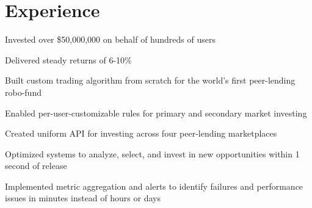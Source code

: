 \documentclass[]{resume}
\begin{document}
\begin{minipage}[t]{0.66\textwidth}



\section{Experience}

\vspace{\topsep} %
\begin{tightemize}
\item Invested over \$50,000,000 on behalf of hundreds of users
\item Delivered steady returns of 6-10\%
\item Built custom trading algorithm from scratch for the world's first peer-lending robo-fund
\item Enabled per-user-customizable rules for primary and secondary market investing
\item Created uniform API for investing across four peer-lending marketplaces
\item Optimized systems to analyze, select, and invest in new opportunities within 1 second of release
\item Implemented metric aggregation and alerts to identify failures and performance issues in minutes instead of hours or days
\end{tightemize}
\sectionsep


\end{minipage}
\end{document}
